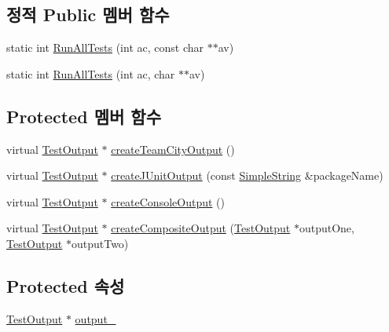 \subsection*{정적 Public 멤버 함수}
\begin{DoxyCompactItemize}
\item 
static int \hyperlink{class_command_line_test_runner_a20babba9f8fa7e8e2bfa1283fc928b33}{Run\+All\+Tests} (int ac, const char $\ast$$\ast$av)
\item 
static int \hyperlink{class_command_line_test_runner_a6964f1801c3f7ea1fc475970e8495b40}{Run\+All\+Tests} (int ac, char $\ast$$\ast$av)
\end{DoxyCompactItemize}
\subsection*{Protected 멤버 함수}
\begin{DoxyCompactItemize}
\item 
virtual \hyperlink{class_test_output}{Test\+Output} $\ast$ \hyperlink{class_command_line_test_runner_a871a61877af19df7f1f71df3b98bd9eb}{create\+Team\+City\+Output} ()
\item 
virtual \hyperlink{class_test_output}{Test\+Output} $\ast$ \hyperlink{class_command_line_test_runner_a18fbb5d195f0ac88e30b3cb26c399adf}{create\+J\+Unit\+Output} (const \hyperlink{class_simple_string}{Simple\+String} \&package\+Name)
\item 
virtual \hyperlink{class_test_output}{Test\+Output} $\ast$ \hyperlink{class_command_line_test_runner_ab1e36315d0fdd8406e23faf8695bb076}{create\+Console\+Output} ()
\item 
virtual \hyperlink{class_test_output}{Test\+Output} $\ast$ \hyperlink{class_command_line_test_runner_aef197cf30b468250d094d829804333f5}{create\+Composite\+Output} (\hyperlink{class_test_output}{Test\+Output} $\ast$output\+One, \hyperlink{class_test_output}{Test\+Output} $\ast$output\+Two)
\end{DoxyCompactItemize}
\subsection*{Protected 속성}
\begin{DoxyCompactItemize}
\item 
\hyperlink{class_test_output}{Test\+Output} $\ast$ \hyperlink{class_command_line_test_runner_ae15a8129794917933fb12ba1e4e6de6f}{output\+\_\+}
\end{DoxyCompactItemize}
